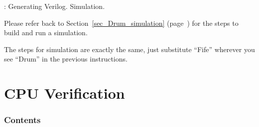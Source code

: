 
\begin{frame}[fragile]

\begin{center}

  \vstrut{0em}{10ex}

  {\LARGE {\FIFE}: Generating Verilog. Simulation.}

  \vspace*{10ex}\scriptsize

  \begin{minipage}{0.8\textwidth}

    Please refer back to Section~\ref{sec_Drum_simulation}
    (page~\pageref{sec_Drum_simulation})
    for the
    steps to build and run a {\DRUM} simulation.

    \vspace*{2ex}

    The steps for {\FIFE} simulation are exactly the same, just
    substitute ``Fife'' wherever you see ``Drum'' in the previous instructions.

  \end{minipage}

\end{center}

\end{frame}


\section{CPU Verification}

\label{sec_verif_w_test_programs}

\begin{frame}[fragile]

\frametitle{Contents}

\begin{center}
 \hmm
 \begin{minipage}{0.5\textwidth}
  \tableofcontents
 \end{minipage}
 \hmm
 \begin{minipage}{0.3\textwidth}\scriptsize\it
  \vstrut{0em}{20ex} \\
 \end{minipage}
\end{center}

\end{frame}

